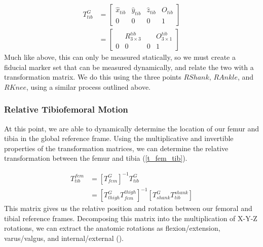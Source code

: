 \documentclass[10pt]{IEEEtran}
\begin{document}
    \begin{equation}
        \begin{aligned}
            T^{G}_{tib} &= \begin{bmatrix}
                \hat{x}_{tib} &\hat{y}_{tib} &\hat{z}_{tib} & O_{tib} \\
                0 & 0 & 0 & 1
            \end{bmatrix} \\
            &= \begin{bmatrix}
                & R^{tib}_{3 \times 3} & & O^{tib}_{3 \times 1} \\
                0 & 0 & 0 & 1
            \end{bmatrix}
        \end{aligned}
        \label{t_gt}
    \end{equation}
    Much like above, this can only be measured statically, so we must create a fiducial marker set that can be measured dynamically, and relate the two with a transformation matrix. We do this using the three points $RShank$, $RAnkle$, and $RKnee$, using a similar process outlined above.

    \subsubsection{Relative Tibiofemoral Motion}
    At this point, we are able to dynamically determine the location of our femur and tibia in the global reference frame. Using the multiplicative and invertible properties of the transformation matrices, we can determine the relative transformation between the femur and tibia (\ref{t_fem_tib}).

    \begin{equation}
        \begin{aligned}
            T^{fem}_{tib} &= [T^{G}_{fem}]^{-1}T^{G}_{tib} \\
            &= [T^{G}_{thigh}T^{thigh}_{fem}]^{-1}[T^{G}_{shank}T^{shank}_{tib}]
        \end{aligned}
        \label{t_fem_tib}
    \end{equation}
    This matrix gives us the relative position and rotation between our femoral and tibial reference frames. Decomposing this matrix into the multiplication of X-Y-Z rotations, we can extract the anatomic rotations as flexion/extension, varus/valgus, and internal/external ().
\end{document}
